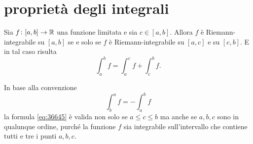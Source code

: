 \section{proprietà degli integrali}
%
%

\begin{theorem}
\mymark{*}%
%
%
%
\label{th:additivita_integrale}%
Sia $f\colon [a,b]\to {\mathbb R}$ una funzione limitata e sia $c\in [a,b]$.
Allora $f$ è Riemann-integrabile su $[a,b]$ se e solo se
$f$ è Riemann-integrabile su $[a,c]$ e su $[c,b]$.
E in tal caso risulta
\begin{equation}\label{eq:36645}
  \int_a^b f = \int_a^c f + \int_c^b f.
\end{equation}

In base alla convenzione
\[
    \int_b^a f = -\int_a^b f
\]
la formula \eqref{eq:36645} è valida non solo se $a\le c\le b$ ma anche
se $a,b,c$ sono in qualunque ordine, purché la funzione $f$ sia integrabile
sull'intervallo che contiene tutti e tre i punti $a,b,c$.
\end{theorem}
%
